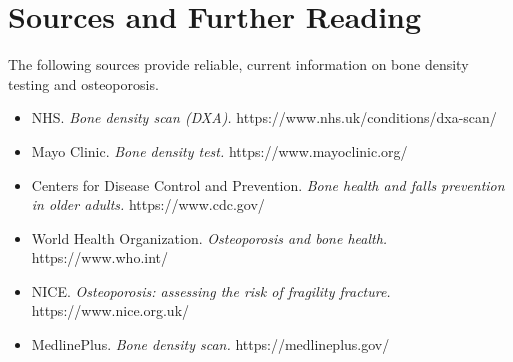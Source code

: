 \section*{Sources and Further Reading}
The following sources provide reliable, current information on bone density testing and osteoporosis.
\begin{itemize}
    \item NHS. \textit{Bone density scan (DXA).} https://www.nhs.uk/conditions/dxa-scan/
    \item Mayo Clinic. \textit{Bone density test.} https://www.mayoclinic.org/
    \item Centers for Disease Control and Prevention. \textit{Bone health and falls prevention in older adults.} https://www.cdc.gov/
    \item World Health Organization. \textit{Osteoporosis and bone health.} https://www.who.int/
    \item NICE. \textit{Osteoporosis: assessing the risk of fragility fracture.} https://www.nice.org.uk/
    \item MedlinePlus. \textit{Bone density scan.} https://medlineplus.gov/
\end{itemize}
